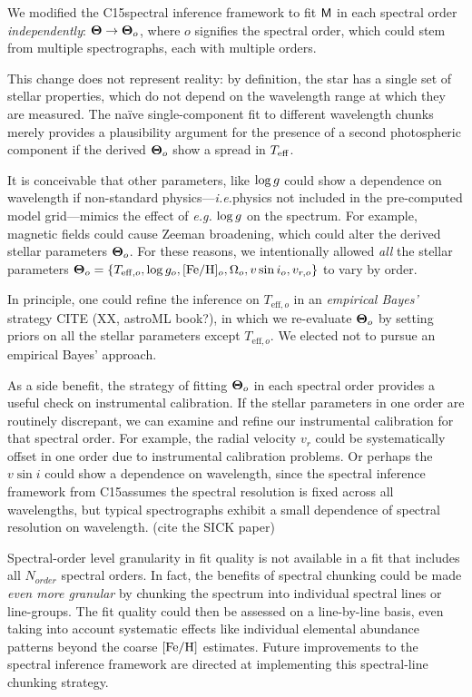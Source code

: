 \documentclass[twocolumn]{emulateapj}%
\newcommand{\iancze}{{\sc C15}}
\begin{document}
We modified the \iancze spectral inference framework to fit $\mathsf{M}$ in each spectral order \emph{independently}: ${\bm \Theta} \rightarrow {\bm \Theta}_o$, where $o$ signifies the spectral order, which could stem from multiple spectrographs, each with multiple orders.  

This change does not represent reality: by definition, the star has a single set of stellar properties, which do not depend on the wavelength range at which they are measured.  The na\"ive single-component fit to different wavelength chunks merely provides a plausibility argument for the presence of a second photospheric component if the derived ${\bm \Theta}_o$ show a spread in $T_\textrm{eff}$.  

It is conceivable that other parameters, like $\log g$ could show a dependence on wavelength if non-standard physics---\emph{i.e.}physics not included in the pre-computed model grid---mimics the effect of \emph{e.g.} $\log g$ on the spectrum.  For example, magnetic fields could cause Zeeman broadening, which could alter the derived stellar parameters ${\bm \Theta}_o$.  For these reasons, we intentionally allowed \emph{all} the stellar parameters ${\bm \Theta}_o = \{T_{\mathrm{eff},o}, \log{g_o}, [{\rm Fe}/{\rm H}]_o, \Omega_{o}, v\sin{i}_o, v_{r,o}\}$ to vary by order.  

In principle, one could refine the inference on $T_{\mathrm{eff},o}$ in an \emph{empirical Bayes'} strategy CITE (XX, astroML book?), in which we re-evaluate ${\bm \Theta}_o$ by setting priors on all the stellar parameters except $T_{\mathrm{eff},o}$.  We elected not to pursue an empirical Bayes' approach.

As a side benefit, the strategy of fitting ${\bm \Theta}_o$ in each spectral order provides a useful check on instrumental calibration. If the stellar parameters in one order are routinely discrepant, we can examine and refine our instrumental calibration for that spectral order.  For example, the radial velocity $v_r$ could be systematically offset in one order due to instrumental calibration problems.  Or perhaps the $v\sin{i}$ could show a dependence on wavelength, since the spectral inference framework from \iancze assumes the spectral resolution is fixed across all wavelengths, but typical spectrographs exhibit a small dependence of spectral resolution on wavelength.  (cite the SICK paper)

Spectral-order level granularity in fit quality is not available in a fit that includes all $N_{order}$ spectral orders.  In fact, the benefits of spectral chunking could be made \emph{even more granular} by chunking the spectrum into individual spectral lines or line-groups.  The fit quality could then be assessed on a line-by-line basis, even taking into account systematic effects like individual elemental abundance patterns beyond the coarse $[{\rm Fe}/{\rm H}]$ estimates.  Future improvements to the spectral inference framework are directed at implementing this spectral-line chunking strategy.  
\end{document}
